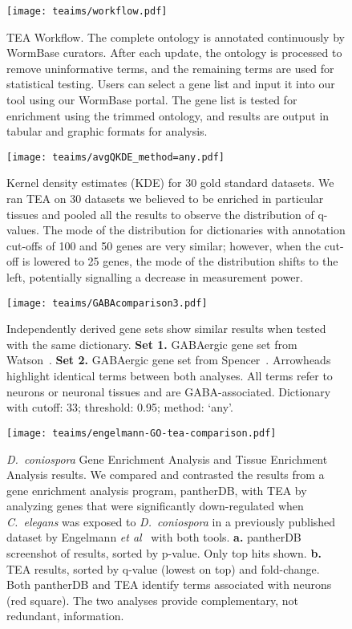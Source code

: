 \begin{figure}[htbp]
	\centering
	\texttt{[image: teaims/workflow.pdf]}
	\caption{
	TEA Workflow.
	The complete ontology is annotated continuously by WormBase curators. After
  each update, the ontology is processed to remove uninformative terms, and the
  remaining terms are used for statistical testing.
	Users can select a gene list and input it into our tool using our WormBase
  portal. The gene list is tested for enrichment using the trimmed ontology, and
  results are output in tabular and graphic formats for analysis.}
\label{fig:workflow}
\end{figure}

\begin{figure}[htbp]
	\texttt{[image: teaims/avgQKDE\_method=any.pdf]}
  \caption{
  Kernel density estimates (KDE) for 30 gold standard datasets.
  We ran TEA on 30 datasets we believed to be enriched in particular tissues
  and pooled all the results to observe the distribution of q-values. The
  mode of the distribution for dictionaries with annotation cut-offs of 100
  and 50 genes are very similar; however, when the cut-off is lowered to 25
  genes, the mode of the distribution shifts to the left, potentially
  signalling a decrease in measurement power.}
\label{fig:qvals}
\end{figure}



\begin{figure}
  \texttt{[image: teaims/GABAcomparison3.pdf]}
  \caption{
  Independently derived gene sets show similar results 	when tested
  with the same dictionary.
  \textbf{Set 1.} GABAergic gene set from Watson~\citep{Watson2008a}.
  \textbf{Set 2.} GABAergic gene set from Spencer~\citep{Spencer2011}.
  Arrowheads highlight identical terms between both analyses. All terms refer to
  neurons or neuronal tissues and are GABA-associated. Dictionary with cutoff:
  33; threshold: 0.95; method: `any'.}
\label{fig:interagree}
\end{figure}


\begin{figure}[htbp]
    \texttt{[image: teaims/engelmann-GO-tea-comparison.pdf]}
  	\caption{
	\emph{D.~coniospora} Gene Enrichment Analysis and Tissue Enrichment
  Analysis results.
	We compared and contrasted the results from a gene enrichment analysis program,
  pantherDB, with TEA by analyzing genes that were significantly down-regulated
  when \emph{C.~elegans} was exposed to \emph{D.~coniospora} in a previously
  published dataset by Engelmann \emph{et al}~\citep{Engelmann2011} with both
  tools.
	\textbf{a.} pantherDB screenshot of results, sorted by p-value. Only top hits
  shown.
	\textbf{b.} TEA results, sorted by q-value (lowest on top) and fold-change.
	Both pantherDB and TEA identify terms associated with neurons (red square). The
  two analyses provide complementary, not redundant, information.
	}
\label{fig:Dcon}
\end{figure}

